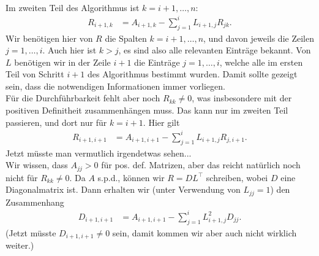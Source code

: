 \documentclass[english, parskip=full]{scrartcl}
\newcommand{\kla}{}
\begin{document}
\\
Im zweiten Teil des Algorithmus ist $k=i+1,\dots,n$:
\begin{align}
R_{i+1,k} &= A_{i+1,k} - \sum_{j=1}^{i} L_{i+1,j}R_{jk}.
\end{align}
Wir benötigen hier von $R$ die Spalten $k=i+1,\dots,n$, und davon jeweils die Zeilen $j=1,\dots,i$.
Auch hier ist $k>j$, es sind also alle relevanten Einträge bekannt.
Von $L$ benötigen wir in der Zeile $i+1$ die Einträge $j=1,\dots,i$, welche alle im ersten Teil von Schritt $i+1$ des Algorithmus bestimmt wurden.
Damit sollte gezeigt sein, dass die notwendigen Informationen immer vorliegen.
\\
Für die Durchführbarkeit fehlt aber noch $R_{kk} \neq 0$, was insbesondere mit der positiven Definitheit zusammenhängen muss.
Das kann nur im zweiten Teil passieren, und dort nur für $k=i+1$.
Hier gilt
\begin{align}
R_{i+1,i+1} &= A_{i+1,i+1} - \sum_{j=1}^i L_{i+1,j}R_{j,i+1}.
\end{align}
Jetzt müsste man vermutlich irgendetwas sehen... 
\\ 
Wir wissen, dass $A_{jj} > 0$ für pos. def. Matrizen, aber das reicht natürlich noch nicht für $R_{kk}\neq 0$.
Da $A$ s.p.d., können wir $R=DL^\top$ schreiben, wobei $D$ eine Diagonalmatrix ist.
Dann erhalten wir (unter Verwendung von $L_{jj} = 1$) den Zusammenhang
\begin{align}
D_{i+1,i+1} &= A_{i+1,i+1} - \sum_{j=1}^i L_{i+1,j}^2 D_{jj}.
\end{align}
(Jetzt müsste $D_{i+1,i+1} \neq 0$ sein, damit kommen wir aber auch nicht wirklich weiter.)
\end{document}
